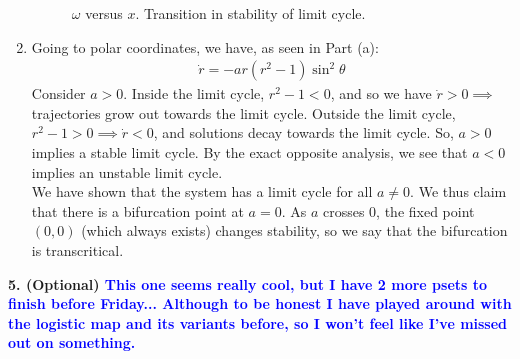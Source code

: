 \documentclass{article}
\theoremstyle{definition}
\begin{document}
\begin{enumerate}[label=(\alph*)]
	\begin{figure}[!htb]
		\centering
		\caption{$\omega$ versus $x$. Transition in stability of limit cycle.}
	\end{figure}
	
	
	
	
	\item Going to polar coordinates, we have, as seen in Part (a):
	\begin{align*}
	\dot r = -ar (r^2 - 1)\sin^2\theta
	\end{align*}
	Consider $a>0$. Inside the limit cycle, $r^2 -1 < 0$, and so we have $\dot r > 0 \implies $ trajectories grow out towards the limit cycle. Outside the limit cycle, $r^2 - 1 > 0 \implies \dot r < 0$, and solutions decay towards the limit cycle. So, $a>0$ implies a stable limit cycle. By the exact opposite analysis, we see that $a<0$ implies an unstable limit cycle. \\
	
	We have shown that the system has a limit cycle for all $a\neq 0$. We thus claim that there is a bifurcation point at $a = 0$. As $a$ crosses $0$, the fixed point $(0,0)$ (which always exists) changes stability, so we say that the bifurcation is transcritical. 
	
\end{enumerate}



\noindent \textbf{5. (Optional) \textcolor{blue}{This one seems really cool, but I have 2 more psets to finish before Friday... Although to be honest I have played around with the logistic map and its variants before, so I won't feel like I've missed out on something. }}
\end{document}
